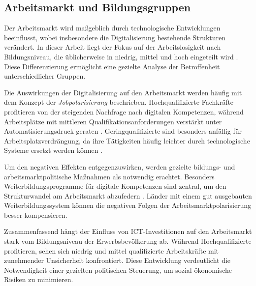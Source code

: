 
\subsection{Arbeitsmarkt und Bildungsgruppen}

Der Arbeitsmarkt wird maßgeblich durch technologische Entwicklungen beeinflusst,
wobei insbesondere die Digitalisierung bestehende Strukturen verändert. In dieser
Arbeit liegt der Fokus auf der Arbeitslosigkeit nach Bildungsniveau, die üblicherweise
in niedrig, mittel und hoch eingeteilt wird \parencite[vgl.][S. 35–37]{frey2013thefuture}.
Diese Differenzierung ermöglicht eine gezielte Analyse der Betroffenheit
unterschiedlicher Gruppen.

Die Auswirkungen der Digitalisierung auf den Arbeitsmarkt werden häufig mit dem
Konzept der \textit{Jobpolarisierung} beschrieben. Hochqualifizierte Fachkräfte 
profitieren von der steigenden Nachfrage nach digitalen Kompetenzen, während 
Arbeitsplätze mit mittleren Qualifikationsanforderungen verstärkt unter 
Automatisierungsdruck geraten \parencite[vgl.][S. 40]{autor2015whyare}. 
Geringqualifizierte sind besonders anfällig für Arbeitsplatzverdrängung, da ihre 
Tätigkeiten häufig leichter durch technologische Systeme ersetzt werden können 
\parencite[vgl.][S. 10]{acemoglu2002technical}.

Um den negativen Effekten entgegenzuwirken, werden gezielte bildungs- und
arbeitsmarktpolitische Maßnahmen als notwendig erachtet. Besonders
Weiterbildungsprogramme für digitale Kompetenzen sind zentral, um den
Strukturwandel am Arbeitsmarkt abzufedern 
\parencite[vgl.][S. 75]{brynjolfsson2014thesecond}. Länder mit einem gut ausgebauten 
Weiterbildungssystem können die negativen Folgen der Arbeitsmarktpolarisierung besser 
kompensieren.

Zusammenfassend hängt der Einfluss von \ac{ICT}-Investitionen auf den Arbeitsmarkt
stark vom Bildungsniveau der Erwerbsbevölkerung ab. Während Hochqualifizierte
profitieren, sehen sich niedrig und mittel qualifizierte Arbeitskräfte mit zunehmender
Unsicherheit konfrontiert. Diese Entwicklung verdeutlicht die Notwendigkeit einer
gezielten politischen Steuerung, um sozial-ökonomische Risiken zu minimieren.
